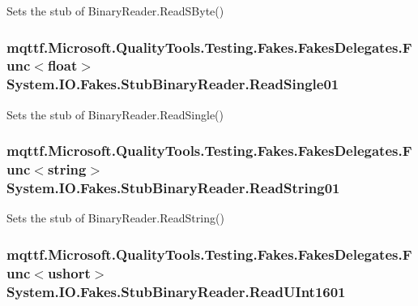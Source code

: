 Sets the stub of Binary\-Reader.\-Read\-S\-Byte()

\hypertarget{class_system_1_1_i_o_1_1_fakes_1_1_stub_binary_reader_a6c222635b3ebec55b83a4f0a2b39318f}{
\subsubsection[{Read\-Single01}]{\setlength{\rightskip}{0pt plus 5cm}mqttf.\-Microsoft.\-Quality\-Tools.\-Testing.\-Fakes.\-Fakes\-Delegates.\-Func$<$float$>$ System.\-I\-O.\-Fakes.\-Stub\-Binary\-Reader.\-Read\-Single01}}\label{class_system_1_1_i_o_1_1_fakes_1_1_stub_binary_reader_a6c222635b3ebec55b83a4f0a2b39318f}


Sets the stub of Binary\-Reader.\-Read\-Single()

\hypertarget{class_system_1_1_i_o_1_1_fakes_1_1_stub_binary_reader_a0f889058ac1a087872934262ef0d99f6}{
\subsubsection[{Read\-String01}]{\setlength{\rightskip}{0pt plus 5cm}mqttf.\-Microsoft.\-Quality\-Tools.\-Testing.\-Fakes.\-Fakes\-Delegates.\-Func$<$string$>$ System.\-I\-O.\-Fakes.\-Stub\-Binary\-Reader.\-Read\-String01}}\label{class_system_1_1_i_o_1_1_fakes_1_1_stub_binary_reader_a0f889058ac1a087872934262ef0d99f6}


Sets the stub of Binary\-Reader.\-Read\-String()

\hypertarget{class_system_1_1_i_o_1_1_fakes_1_1_stub_binary_reader_a9965be48643acce36dd9b4f24f9ddf19}{
\subsubsection[{Read\-U\-Int1601}]{\setlength{\rightskip}{0pt plus 5cm}mqttf.\-Microsoft.\-Quality\-Tools.\-Testing.\-Fakes.\-Fakes\-Delegates.\-Func$<$ushort$>$ System.\-I\-O.\-Fakes.\-Stub\-Binary\-Reader.\-Read\-U\-Int1601}}\label{class_system_1_1_i_o_1_1_fakes_1_1_stub_binary_reader_a9965be48643acce36dd9b4f24f9ddf19}


